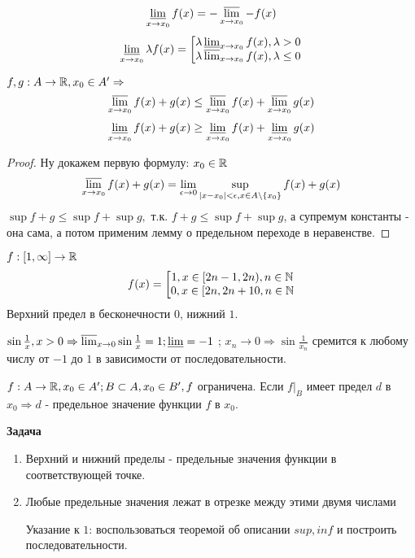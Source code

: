\documentclass[12pt]{report}
\begin{document}
\begin{cor}
$$\varliminf_{x \to x_0}{f(x)} = -\varlimsup_{x \to x_0}{-f(x)}$$
$$
\varliminf_{x \to x_0}{\lambda f(x)} = 
\left[
\begin{matrix}
\lambda \varliminf_{x \to x_0}{f(x)}, \lambda > 0\\
\lambda \varlimsup_{x \to x_0}{f(x)}, \lambda \le 0
\end{matrix}\right.
$$
\end{cor}

\begin{st}
$f, g: A \to \mathbb{R}, x_0 \in A' \Rightarrow$
$$\varlimsup_{x \to x_0}{f(x) + g(x)} \le \varlimsup_{x \to x_0}{f(x)} + \varlimsup_{x \to x_0}{g(x)} $$ 
$$\varliminf_{x \to x_0}{f(x) + g(x)} \ge \varliminf_{x \to x_0}{f(x)} + \varliminf_{x \to x_0}{g(x)} $$ 
\end{st}
\begin{proof}
Ну докажем первую формулу:
$x_0 \in \mathbb{R}$
$$\varlimsup_{x \to x_0}{f(x) + g(x)} = \lim_{\epsilon \to 0}{\sup_{|x - x_0| < \epsilon, x \in A\setminus\{x_0\}}{f(x) + g(x)}}$$
$\sup{f + g} \le \sup{f} + \sup{g},$ т.к. $f + g \le \sup{f} + \sup{g}$, а супремум константы - она сама, а потом применим лемму о предельном переходе в неравенстве.
\end{proof}

\begin{ex}
$f: [1, \infty] \to \mathbb{R}$
$$f(x) = \left[
\begin{matrix}
1, x \in [2n - 1, 2n), n \in \mathbb{N}\\
0, x \in [2n, 2n + 10, n \in \mathbb{N}
\end{matrix}\right.
$$
Верхний предел в бесконечности $0$, нижний $1$.
\end{ex}

\begin{ex}[2]
$\sin{\frac{1}{x}}, x > 0 \Rightarrow \varlimsup_{x \to 0}{\sin{\frac{1}{x}}} = 1; \varliminf = -1$ ; $x_n \to 0 \Rightarrow \sin{\frac{1}{x_n}}$ сремится к любому числу от $-1$ до $1$ в зависимости от последовательности.
\end{ex}

\begin{defn}
$f: A \to \mathbb{R}, x_0 \in A'; B \subset A, x_0 \in B', f$ ограничена. Если $f|_B$ имеет предел $d$ в $x_0 \Rightarrow d$ - предельное значение функции $f$ в $x_0$.
\end{defn}

{\bfseries Задача}
\begin{enumerate}
\item Верхний и нижний пределы - предельные значения функции в соответствующей точке.
\item Любые предельные значения лежат в отрезке между этими двумя числами

Указание к $1$: воспользоваться теоремой об описании $sup, inf$ и построить последовательности.
\end{enumerate}
\end{document}
